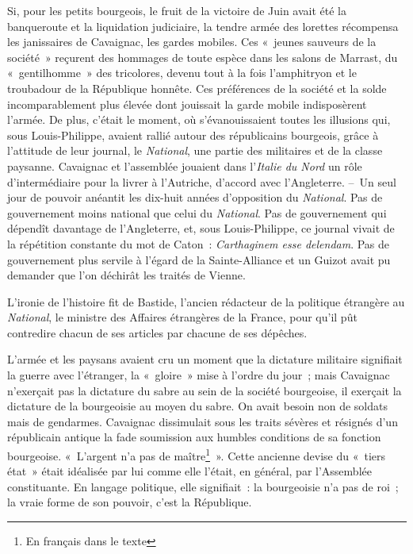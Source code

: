 \documentclass[twoside]{book} %
\begin{document}
Si, pour les petits bourgeois, le fruit de la victoire de Juin avait été la banqueroute et la liquidation judiciaire, la tendre armée des lorettes récompensa les janissaires de Cavaignac, les gardes mobiles. Ces « jeunes sauveurs de la société » reçurent des hommages de toute espèce dans les salons de Marrast, du « gentilhomme » des tricolores, devenu tout à la fois l’amphitryon et le troubadour de la République honnête. Ces préférences de la société et la solde incomparablement plus élevée dont jouissait la garde mobile indisposèrent l’armée. De plus, c’était le moment, où s’évanouissaient toutes les illusions qui, sous Louis-Philippe, avaient rallié autour des républicains bourgeois, grâce à l’attitude de leur journal, le \emph{National}, une partie des militaires et de la classe paysanne. Cavaignac et l’assemblée jouaient dans l’\emph{Italie du Nord} un rôle d’intermédiaire pour la livrer à l’Autriche, d’accord avec l’Angleterre. – Un seul jour de pouvoir anéantit les dix-huit années d’opposition du \emph{National}. Pas de gouvernement moins national que celui du \emph{National}. Pas de gouvernement qui dépendît davantage de l’Angleterre, et, sous Louis-Philippe, ce journal vivait de la répétition constante du mot de Caton : \emph{Carthaginem esse delendam}. Pas de gouvernement plus servile à l’égard de la Sainte-Alliance et un Guizot avait pu demander que l’on déchirât les traités de Vienne.\par
L’ironie de l’histoire fit de Bastide, l’ancien rédacteur de la politique étrangère au \emph{National}, le ministre des Affaires étrangères de la France, pour qu’il pût contredire chacun de ses articles par chacune de ses dépêches.\par
L’armée et les paysans avaient cru un moment que la dictature militaire signifiait la guerre avec l’étranger, la « gloire » mise à l’ordre du jour ; mais Cavaignac n’exerçait pas la dictature du sabre au sein de la société bourgeoise, il exerçait la dictature de la bourgeoisie au moyen du sabre. On avait besoin non de soldats mais de gendarmes. Cavaignac dissimulait sous les traits sévères et résignés d’un républicain antique la fade soumission aux humbles conditions de sa fonction bourgeoise. « L’argent n’a pas de maître\footnote{En français dans le texte} ». Cette ancienne devise du « tiers état » était idéalisée par lui comme elle l’était, en général, par l’Assemblée constituante. En langage politique, elle signifiait : la bourgeoisie n’a pas de roi ; la vraie forme de son pouvoir, c’est la République.\par
\end{document}
